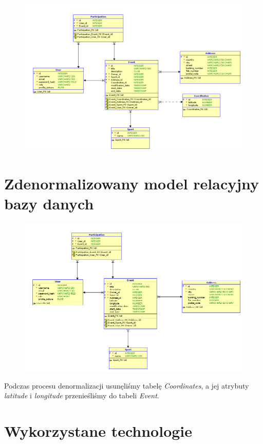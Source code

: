 \documentclass[11pt,a4paper]{article}
\begin{document}
\begin{figure} [H]
    \centering
    \includegraphics[width=0.95\linewidth]{../model/model_rel.png}
\end{figure}

\section{Zdenormalizowany model relacyjny bazy danych}

\begin{figure} [H]
    \centering
    \includegraphics[width=0.95\linewidth]{../model/model_denorm.png}
\end{figure}

Podczas procesu denormalizacji usunęliśmy tabelę \textit{Coordinates}, a jej atrybuty \textit{latitude} i \textit{longitude} przenieśliśmy do tabeli \textit{Event}.

\section{Wykorzystane technologie}
\end{document}
